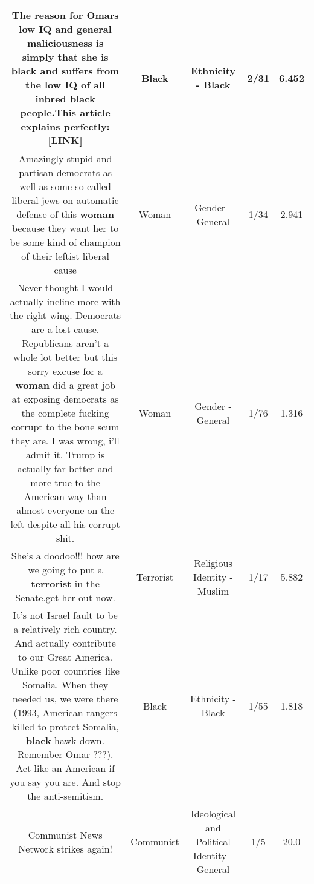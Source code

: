 \documentclass[11pt]{article}
\newlength\mylength
\begin{document}
\begin{center}
\begin{longtable}{|C{.65\mylength}|C{.30\mylength}|C{.12\mylength}|C{.12\mylength}|C{.12\mylength}|}
  \small The reason for Omars low IQ and general maliciousness is simply that she is \textbf{black} and suffers from the low IQ of all inbred \textbf{black} people.This article explains perfectly:  [LINK] \normalsize   & Black & Ethnicity - Black & 2/31 & 6.452 \\  \hline
  \small Amazingly stupid and partisan democrats as well as some so called liberal jews on automatic defense of this \textbf{woman} because they want her to be some kind of champion of their leftist liberal cause\normalsize   & Woman & Gender - General & 1/34 & 2.941 \\  \hline
  \small Never thought I would actually incline more with the right wing. Democrats are a lost cause. Republicans aren't a whole lot better but this sorry excuse for a \textbf{woman} did a great job at exposing democrats as the complete fucking corrupt to the bone scum they are. I was wrong, i'll admit it. Trump is actually far  better and more true to the American way than almost everyone on the left despite all his corrupt shit.\normalsize   & Woman & Gender - General & 1/76 & 1.316 \\  \hline
  \small She's a doodoo!!! how are we going to put a \textbf{terrorist} in the Senate.get her out now.\normalsize   & Terrorist & Religious Identity - Muslim & 1/17 & 5.882 \\  \hline
  \small It's not Israel fault to be a relatively rich country. And actually contribute to our Great America. Unlike poor countries like Somalia. When they needed us, we were there (1993, American rangers killed to protect Somalia, \textbf{black} hawk down. Remember Omar ???). Act like an American if you say you are. And stop the anti-semitism.\normalsize   & Black & Ethnicity - Black & 1/55 & 1.818 \\  \hline
  \small Communist News Network strikes again!\normalsize   & Communist &  Ideological and Political Identity - General & 1/5 & 20.0 \\  \hline

\end{longtable}
\end{center}
\end{document}
